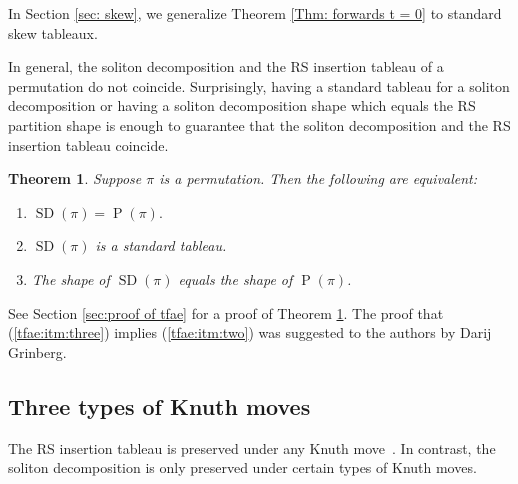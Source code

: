 \documentclass[submission]{FPSAC2021}
\theoremstyle{plain}
\newtheorem{theorem}{Theorem}[section]
\theoremstyle{definition}
\numberwithin{equation}{section}
\DeclareMathOperator{\SDself}{SD}
\DeclareMathOperator{\Ptself}{P}
\newcommand{\SD}[1]{\SDself(#1)}
\renewcommand{\P}[1]{\Ptself(#1)}
\begin{document}
In Section \ref{sec: skew}, we generalize Theorem \ref{Thm: forwards t = 0} to standard skew tableaux. 

In general, the soliton decomposition and the RS insertion tableau of a permutation do not coincide.
Surprisingly, having a standard tableau for a soliton decomposition 
or having a soliton decomposition shape which equals the RS partition shape 
is enough to guarantee that the soliton decomposition and the RS insertion  tableau coincide.

\begin{theorem}\label{thm:tfae} 
Suppose $\pi$ is a permutation. Then 
    the following are equivalent:
    \begin{enumerate}
        \item\label{tfae:itm:one} 
        $\SD{\pi} = \P{\pi}.$
        \item\label{tfae:itm:two} 
        $\SD{\pi}$ is a standard tableau.
        \item \label{tfae:itm:three}
        The shape of $\SD{\pi}$ equals the shape of $\P{\pi}$.
    \end{enumerate}
    \end{theorem}
 See Section \ref{sec:proof of tfae} for a proof of Theorem \ref{thm:tfae}. 
 The proof that  (\ref{tfae:itm:three}) implies (\ref{tfae:itm:two}) 
 was suggested to the authors by Darij Grinberg. 

\subsection{Three types of Knuth moves}

The RS insertion tableau is preserved under any Knuth move~\cite{Knuth70}. 
In contrast, the soliton decomposition is only  preserved under certain types of Knuth moves. 
\end{document}
